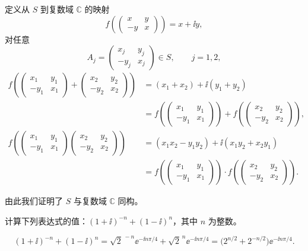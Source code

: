 \begin{question}
\begin{solution}
定义从 \(S\) 到复数域 \(\mathbb{C}\) 的映射
\[
f\!\left(\begin{pmatrix}x&y\\-y&x\end{pmatrix}\right)=x+\ii y,
\]
对任意
\[
A_j=\begin{pmatrix}x_j&y_j\\-y_j&x_j\end{pmatrix}\in S,
\qquad j=1,2,
\]
\[
\begin{aligned}
f\!\left(\begin{pmatrix}x_1&y_1\\-y_1&x_1\end{pmatrix}
+\begin{pmatrix}x_2&y_2\\-y_2&x_2\end{pmatrix}\right)
&=(x_1+x_2)+\ii(y_1+y_2)\\
&=f\!\left(\begin{pmatrix}x_1&y_1\\-y_1&x_1\end{pmatrix}\right)
+f\!\left(\begin{pmatrix}x_2&y_2\\-y_2&x_2\end{pmatrix}\right),\\[4pt]
f\!\left(\begin{pmatrix}x_1&y_1\\-y_1&x_1\end{pmatrix}
\begin{pmatrix}x_2&y_2\\-y_2&x_2\end{pmatrix}\right)
&=(x_1x_2-y_1y_2)+\ii(x_1y_2+x_2y_1)\\
&=f\!\left(\begin{pmatrix}x_1&y_1\\-y_1&x_1\end{pmatrix}\right)
\cdot f\!\left(\begin{pmatrix}x_2&y_2\\-y_2&x_2\end{pmatrix}\right).
\end{aligned}
\]

由此我们证明了 \(S\) 与复数域 \(\mathbb{C}\) 同构。
\end{solution}
\end{question}


\begin{question}
计算下列表达式的值：\((1+\ii)^{-n}+(1-\ii)^{n}\)，其中 \(n\) 为整数。
\begin{solution}
\[
(1+\ii)^{-n}+(1-\ii)^{n}
= \sqrt{2}^{\,-n}\ee^{-\ii n\pi/4} + \sqrt{2}^{\,n}\ee^{-\ii n\pi/4}
= \bigl(2^{n/2}+2^{-n/2}\bigr)\ee^{-\ii n\pi/4}.
\]
\end{solution}
\end{question}


